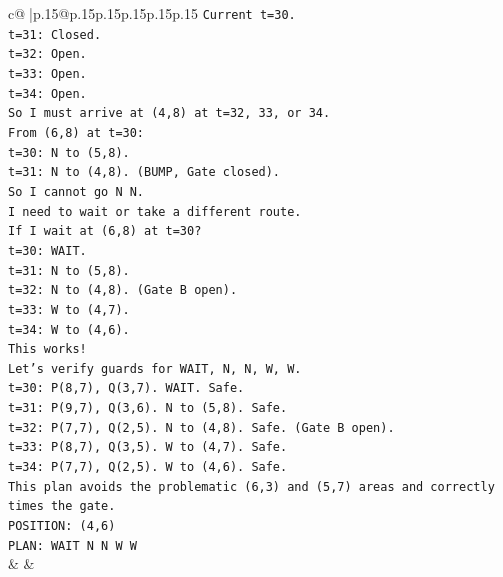 \documentclass{article}
\begin{document}
{\begin{supertabular}{c@{$\;$}|p{.15\linewidth}@{}p{.15\linewidth}p{.15\linewidth}p{.15\linewidth}p{.15\linewidth}p{.15\linewidth}}
{{{\texttt{Current t=30.} \\
\texttt{t=31: Closed.} \\
\texttt{t=32: Open.} \\
\texttt{t=33: Open.} \\
\texttt{t=34: Open.} \\
\texttt{So I must arrive at (4,8) at t=32, 33, or 34.} \\
\texttt{From (6,8) at t=30:} \\
\texttt{t=30: N to (5,8).} \\
\texttt{t=31: N to (4,8). (BUMP, Gate closed).} \\
\texttt{So I cannot go N N.} \\
\texttt{I need to wait or take a different route.} \\
\texttt{If I wait at (6,8) at t=30?} \\
\texttt{t=30: WAIT.} \\
\texttt{t=31: N to (5,8).} \\
\texttt{t=32: N to (4,8). (Gate B open).} \\
\texttt{t=33: W to (4,7).} \\
\texttt{t=34: W to (4,6).} \\
\texttt{This works!} \\
\texttt{Let's verify guards for WAIT, N, N, W, W.} \\
\texttt{t=30: P(8,7), Q(3,7). WAIT. Safe.} \\
\texttt{t=31: P(9,7), Q(3,6). N to (5,8). Safe.} \\
\texttt{t=32: P(7,7), Q(2,5). N to (4,8). Safe. (Gate B open).} \\
\texttt{t=33: P(8,7), Q(3,5). W to (4,7). Safe.} \\
\texttt{t=34: P(7,7), Q(2,5). W to (4,6). Safe.} \\
\texttt{This plan avoids the problematic (6,3) and (5,7) areas and correctly times the gate.} \\
\texttt{POSITION: (4,6)} \\
\texttt{PLAN: WAIT N N W W} \\
            }
        }
    }
    & & \\ \\


\end{supertabular}}
\end{document}
